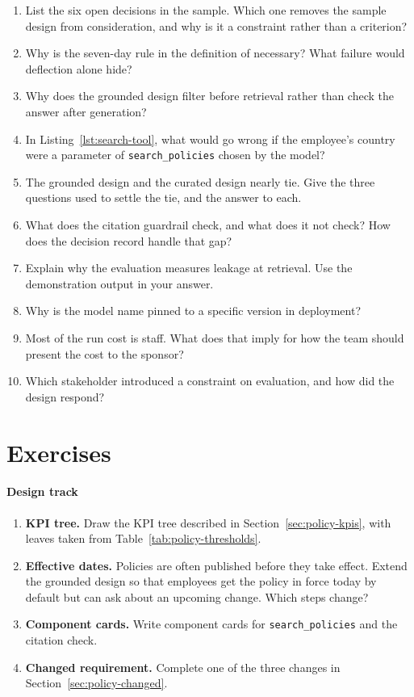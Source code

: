 \begin{enumerate}[itemsep=2pt]
  \item List the six open decisions in the sample. Which one removes the sample design from consideration, and why is it a constraint rather than a criterion?
  \item Why is the seven-day rule in the definition of  necessary? What failure would deflection alone hide?
  \item Why does the grounded design filter before retrieval rather than check the answer after generation?
  \item In Listing~\ref{lst:search-tool}, what would go wrong if the employee's country were a parameter of \texttt{search\_policies} chosen by the model?
  \item The grounded design and the curated design nearly tie. Give the three questions used to settle the tie, and the answer to each.
  \item What does the citation guardrail check, and what does it not check? How does the decision record handle that gap?
  \item Explain why the evaluation measures leakage at retrieval. Use the demonstration output in your answer.
  \item Why is the model name pinned to a specific version in deployment?
  \item Most of the run cost is staff. What does that imply for how the team should present the cost to the sponsor?
  \item Which stakeholder introduced a constraint on evaluation, and how did the design respond?
\end{enumerate}

\section*{Exercises}

\paragraph{Design track}
\begin{enumerate}[itemsep=2pt]
  \item \textbf{KPI tree.} Draw the KPI tree described in Section~\ref{sec:policy-kpis}, with leaves taken from Table~\ref{tab:policy-thresholds}.
  \item \textbf{Effective dates.} Policies are often published before they take effect. Extend the grounded design so that employees get the policy in force today by default but can ask about an upcoming change. Which steps change?
  \item \textbf{Component cards.} Write component cards for \texttt{search\_policies} and the citation check.
  \item \textbf{Changed requirement.} Complete one of the three changes in Section~\ref{sec:policy-changed}.
\end{enumerate}

